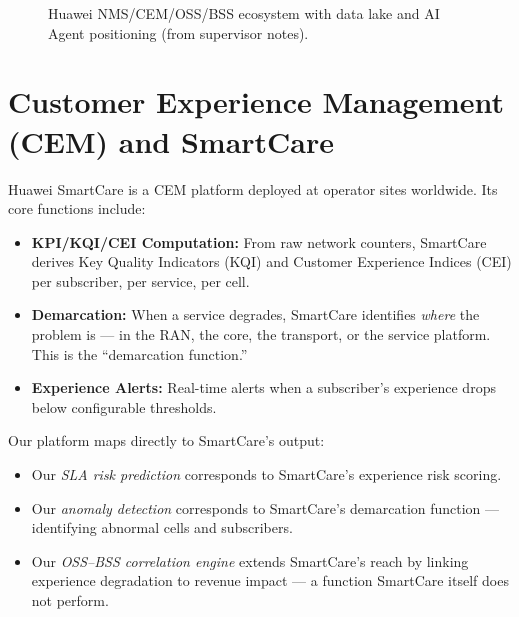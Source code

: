 \begin{figure}[H]
\caption{Huawei NMS/CEM/OSS/BSS ecosystem with data lake and AI Agent positioning (from supervisor notes).}
\label{fig:huawei-stack}
\end{figure}

\section{Customer Experience Management (CEM) and SmartCare}

Huawei SmartCare is a CEM platform deployed at operator sites worldwide. Its core functions include:

\begin{itemize}
  \item \textbf{KPI/KQI/CEI Computation:} From raw network counters, SmartCare derives Key Quality Indicators (KQI) and Customer Experience Indices (CEI) per subscriber, per service, per cell.
  \item \textbf{Demarcation:} When a service degrades, SmartCare identifies \emph{where} the problem is --- in the RAN, the core, the transport, or the service platform. This is the ``demarcation function.''
  \item \textbf{Experience Alerts:} Real-time alerts when a subscriber's experience drops below configurable thresholds.
\end{itemize}

Our platform maps directly to SmartCare's output:
\begin{itemize}
  \item Our \emph{SLA risk prediction} corresponds to SmartCare's experience risk scoring.
  \item Our \emph{anomaly detection} corresponds to SmartCare's demarcation function --- identifying abnormal cells and subscribers.
  \item Our \emph{OSS--BSS correlation engine} extends SmartCare's reach by linking experience degradation to revenue impact --- a function SmartCare itself does not perform.
\end{itemize}

